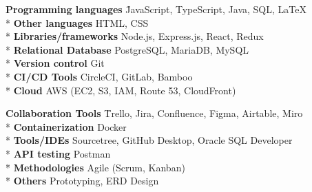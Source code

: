 

\begin{cvparagraph}

\begin{multicols}{2}

\begin{nospacetabbing}
\textbf{Programming languages} \= JavaScript, TypeScript, Java, SQL, LaTeX\\*
\textbf{Other languages} \> HTML, CSS\\*
\textbf{Libraries/frameworks} \> Node.js, Express.js, React, Redux\\*
\textbf{Relational Database} \> PostgreSQL, MariaDB, MySQL\\*
\textbf{Version control} \> Git\\*
\textbf{CI/CD Tools} \> CircleCI, GitLab, Bamboo\\*
\textbf{Cloud} \> AWS (EC2, S3, IAM, Route 53, CloudFront)
\end{nospacetabbing}

\columnbreak

\begin{nospacetabbing}
\textbf{Collaboration Tools} \= Trello, Jira, Confluence, Figma, Airtable, Miro\\*
\textbf{Containerization} \> Docker \\* 
\textbf{Tools/IDEs} \> Sourcetree, GitHub Desktop, Oracle SQL Developer\\*
\textbf{API testing} \> Postman\\*
\textbf{Methodologies} \> Agile (Scrum, Kanban)\\*
\textbf{Others} \> Prototyping, ERD Design
\end{nospacetabbing}

\end{multicols}
\vspace{-2mm}

\end{cvparagraph}
